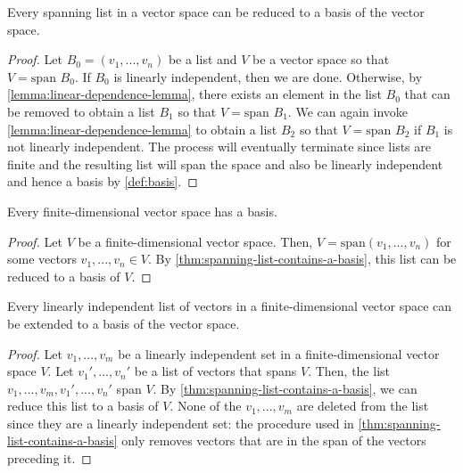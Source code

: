 \documentclass{article}
\begin{document}
\begin{theorem}
  \label{thm:spanning-list-contains-a-basis}
  Every spanning list in a vector space can be reduced to a basis of
  the vector space.
\end{theorem}
\begin{proof}
  Let $B_0 = (v_1, ..., v_n)$ be a list and $V$ be a vector space so
  that $V = \text{span } B_0$. If $B_0$ is linearly independent, then
  we are done. Otherwise, by \cref{lemma:linear-dependence-lemma},
  there exists an element in the list $B_0$ that can be removed to
  obtain a list $B_1$ so that $V = \text{span } B_1$. We can again
  invoke \cref{lemma:linear-dependence-lemma} to obtain a list $B_2$
  so that $V = \text{span } B_2$ if $B_1$ is not linearly
  independent. The process will eventually terminate since lists are
  finite and the resulting list will span the space and also be
  linearly independent and hence a basis by \cref{def:basis}.
\end{proof}

\begin{corollary}
  \label{cor:finite-dim-has-basis}
  Every finite-dimensional vector space has a basis.
\end{corollary}
\begin{proof}
  Let $V$ be a finite-dimensional vector space. Then, $V =
  \text{span}(v_1, ..., v_n)$ for some vectors $v_1, ..., v_n \in
  V$. By \cref{thm:spanning-list-contains-a-basis}, this list can be
  reduced to a basis of $V$.
\end{proof}

\begin{theorem}
  \label{thm:extend-basis-finite-dimensional}
  Every linearly independent list of vectors in a finite-dimensional
  vector space can be extended to a basis of the vector space.
\end{theorem}
\begin{proof}
  Let $v_1, ..., v_m$ be a linearly independent set in a
  finite-dimensional vector space $V$. Let $v_1', ..., v_n'$ be a list
  of vectors that spans $V$. Then, the list $v_1, ..., v_m, v_1', ...,
  v_n'$ span $V$. By \cref{thm:spanning-list-contains-a-basis}, we can
  reduce this list to a basis of $V$. None of the $v_1, ..., v_m$ are
  deleted from the list since they are a linearly independent set: the
  procedure used in \cref{thm:spanning-list-contains-a-basis} only
  removes vectors that are in the span of the vectors preceding it.
\end{proof}
\end{document}
